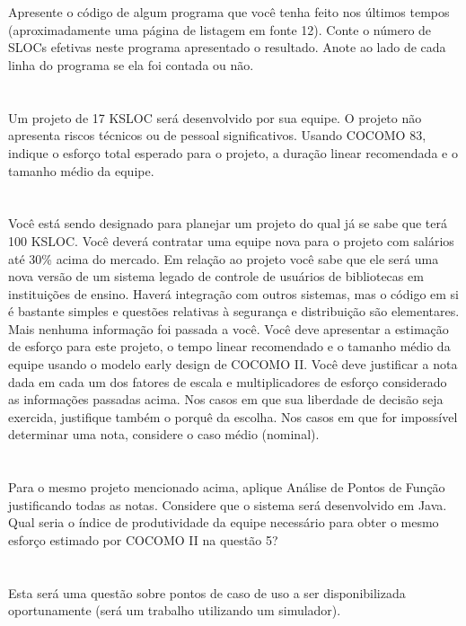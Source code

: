 \documentclass[10pt,a5paper]{report}
\begin{document}
\section{}

\qquad Apresente o código de algum programa que você tenha feito nos últimos tempos
(aproximadamente uma página de listagem em fonte 12). Conte o número de SLOCs
efetivas neste programa apresentado o resultado. Anote ao lado de cada linha do
programa se ela foi contada ou não.

\section{}

\qquad Um projeto de 17 KSLOC será desenvolvido por sua equipe. O projeto não
apresenta riscos técnicos ou de pessoal significativos. Usando COCOMO 83,
indique o esforço total esperado para o projeto, a duração linear recomendada e
o tamanho médio da equipe.

\section{}

\qquad Você está sendo designado para planejar um projeto do qual já se sabe que
terá 100 KSLOC. Você deverá contratar uma equipe nova para o projeto com
salários até 30\% acima do mercado. Em relação ao projeto você sabe que ele será
uma nova versão de um sistema legado de controle de usuários de bibliotecas em
instituições de ensino. Haverá integração com outros sistemas, mas o código em
si é bastante simples e questões relativas à segurança e distribuição são
elementares. Mais nenhuma informação foi passada a você. Você deve apresentar a
estimação de esforço para este projeto, o tempo linear recomendado e o tamanho
médio da equipe usando o modelo early design de COCOMO II. Você deve justificar
a nota dada em cada um dos fatores de escala e multiplicadores de esforço
considerado as informações passadas acima. Nos casos em que sua liberdade de
decisão seja exercida, justifique também o porquê da escolha. Nos casos em que
for impossível determinar uma nota, considere o caso médio (nominal).

\section{}
\qquad Para o mesmo projeto mencionado acima, aplique Análise de Pontos de Função
justificando todas as notas. Considere que o sistema será desenvolvido em Java.
Qual seria o índice de produtividade da equipe necessário para obter o mesmo
esforço estimado por COCOMO II na questão 5?

\section{}
\qquad Esta será uma questão sobre pontos de caso de uso a ser disponibilizada
oportunamente (será um trabalho utilizando um simulador).
\end{document}
